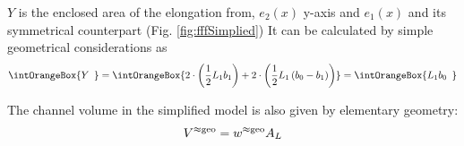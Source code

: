 $Y$ is the enclosed area of the elongation from,
$e_2(x)$ y-axis and $e_1(x)$ and its symmetrical counterpart 
(Fig. \ref{fig:fffSimplied})
It can be calculated by simple geometrical considerations as 
\begin{equation}
\intOrangeBox{\ensuremath{ Y \hspace{-4ex}\phantom{\left(\frac{1}{2}\right)} }} 
= \intOrangeBox{\ensuremath{ 2\cdot\left(\frac{1}{2} L_1 b_1 \right)
  + 2\cdot\left( \frac{1}{2} L_1 \left( b_0 - b_1 \right) \right) }} 
=\intOrangeBox{\ensuremath{ L_1 b_0 \hspace{-4ex}\phantom{\left(\frac{1}{2}\right)} } }
\end{equation}

The channel volume in the simplified model is also given by elementary geometry:
\begin{equation}
  V^{\approx\text{geo}} = w^{\approx\text{geo}} A_L
\end{equation}

